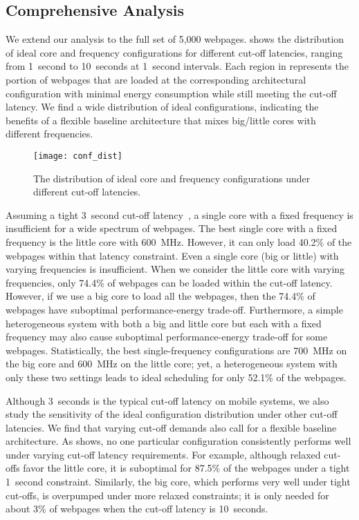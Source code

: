 \subsection{Comprehensive Analysis}
\label{sec:runtime:char:comprehensive}

We extend our analysis to the full set of 5,000 webpages.  shows the distribution of ideal core and frequency configurations for different cut-off latencies, ranging from 1~second to 10~seconds at 1~second intervals. Each region in  represents the portion of webpages that are loaded at the corresponding architectural configuration with minimal energy consumption while still meeting the cut-off latency. We find a wide distribution of ideal configurations, indicating the benefits of a flexible baseline architecture that mixes big/little cores with different frequencies. 

\begin{figure}[t]
\centering
\texttt{[image: conf\_dist]}
\caption{The distribution of ideal core and frequency configurations under different cut-off latencies.}
\label{fig:conf-dist}
\end{figure}

Assuming a tight 3~second cut-off latency~\cite{ThreeSecond}, a single core with a fixed frequency is insufficient for a wide spectrum of webpages.  The best single core with a fixed frequency is the little core with 600~MHz.  However, it can only load 40.2\% of the webpages within that latency constraint. Even a single core (big or little) with varying frequencies is insufficient. When we consider the little core with varying frequencies, only 74.4\% of webpages can be loaded within the cut-off latency. However, if we use a big core to load all the webpages, then the 74.4\% of webpages have suboptimal performance-energy trade-off. Furthermore, a simple heterogeneous system with both a big and little core but each with a fixed frequency may also cause suboptimal performance-energy trade-off for some webpages. Statistically, the best single-frequency configurations are 700~MHz on the big core and 600~MHz on the little core; yet, a heterogeneous system with only these two settings leads to ideal scheduling for only 52.1\% of the webpages.

Although 3~seconds is the typical cut-off latency on mobile systems, we also study the sensitivity of the ideal configuration distribution under other cut-off latencies. We find that varying cut-off demands also call for a flexible baseline architecture. As  shows, no one particular configuration consistently performs well under varying cut-off latency requirements. For example, although relaxed cut-offs favor the little core, it is suboptimal for 87.5\% of the webpages under a tight 1~second constraint. Similarly, the big core, which performs very well under tight cut-offs, is overpumped under more relaxed constraints; it is only needed for about 3\% of webpages when the cut-off latency is 10~seconds.

